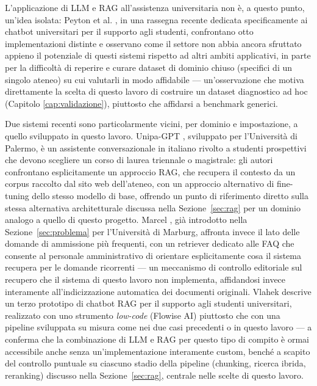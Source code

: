 L'applicazione di LLM e RAG all'assistenza universitaria non è, a questo punto, un'idea isolata: Peyton et al.
\cite{peyton2025review}, in una rassegna recente dedicata specificamente ai chatbot universitari per il supporto agli
studenti, confrontano otto implementazioni distinte e osservano come il settore non abbia ancora sfruttato appieno il
potenziale di questi sistemi rispetto ad altri ambiti applicativi, in parte per la difficoltà di reperire e curare
dataset di dominio chiuso (specifici di un singolo ateneo) su cui valutarli in modo affidabile --- un'osservazione
che motiva direttamente la scelta di questo lavoro di costruire un dataset diagnostico ad hoc (Capitolo
\ref{cap:validazione}), piuttosto che affidarsi a benchmark generici.

Due sistemi recenti sono particolarmente vicini, per dominio e impostazione, a quello sviluppato in questo lavoro.
Unipa-GPT \cite{siragusa2024unipagpt}, sviluppato per l'Università di Palermo, è un assistente conversazionale in
italiano rivolto a studenti prospettivi che devono scegliere un corso di laurea triennale o magistrale: gli autori
confrontano esplicitamente un approccio RAG, che recupera il contesto da un corpus raccolto dal sito web
dell'ateneo, con un approccio alternativo di fine-tuning dello stesso modello di base, offrendo un punto di
riferimento diretto sulla stessa alternativa architetturale discussa nella Sezione~\ref{sec:rag} per un dominio
analogo a quello di questo progetto. Marcel \cite{trienes2025marcel}, già introdotto nella Sezione~\ref{sec:problema}
per l'Università di Marburg, affronta invece il lato delle domande di ammissione più frequenti, con un retriever
dedicato alle FAQ che consente al personale amministrativo di orientare esplicitamente cosa il sistema recupera per
le domande ricorrenti --- un meccanismo di controllo editoriale sul recupero che il sistema di questo lavoro non
implementa, affidandosi invece interamente all'indicizzazione automatica dei documenti originali. Vlahek
\cite{vlahek2024chatbot} descrive un terzo prototipo di chatbot RAG per il supporto agli studenti universitari,
realizzato con uno strumento \emph{low-code} (Flowise AI) piuttosto che con una pipeline sviluppata su misura come
nei due casi precedenti o in questo lavoro --- a conferma che la combinazione di LLM e RAG per questo tipo di compito
è ormai accessibile anche senza un'implementazione interamente custom, benché a scapito del controllo puntuale su
ciascuno stadio della pipeline (chunking, ricerca ibrida, reranking) discusso nella Sezione~\ref{sec:rag}, centrale
nelle scelte di questo lavoro.

